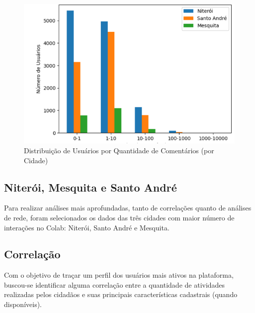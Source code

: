 \begin{figure}[!htb]
	\caption{Distribuição de Usuários por Quantidade de Comentários (por Cidade)}
	\label{fig:colab_comments_by_city}
	\centering
	\includegraphics[scale=0.8]{images/colab_comments_by_city.png}
\end{figure}

\subsection*{Niterói, Mesquita e Santo André}

Para realizar análises mais aprofundadas, tanto de correlações quanto de análises de rede, foram selecionados os dados das três cidades com maior número de interações no Colab: Niterói, Santo André e Mesquita.

\subsection*{Correlação}

Com o objetivo de traçar um perfil dos usuários mais ativos na plataforma, buscou-se identificar alguma correlação entre a quantidade de atividades realizadas pelos cidadãos e suas principais características cadastrais (quando disponíveis).

